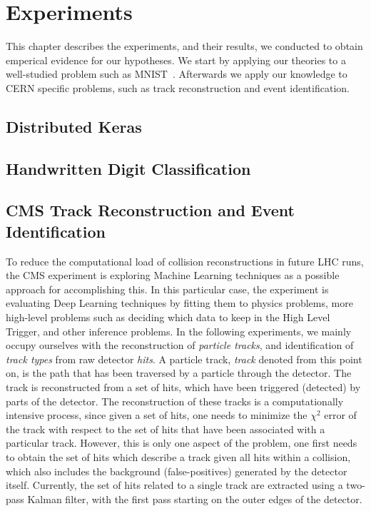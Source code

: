 %
%
%

\chapter{Experiments}
\label{chapter:experiments}

This chapter describes the experiments, and their results, we conducted to obtain emperical evidence for our hypotheses. We start by applying our theories to a well-studied problem such as MNIST~\cite{mnist}. Afterwards we apply our knowledge to CERN specific problems, such as track reconstruction and event identification.

\section{Distributed Keras}
\label{sec:distributed_keras}

\section{Handwritten Digit Classification}
\label{sec:experiment_mnist}

\section{CMS Track Reconstruction and Event Identification}
\label{sec:experiment_track_reconstruction}

To reduce the computational load of collision reconstructions in future LHC runs, the CMS experiment is exploring Machine Learning techniques as a possible approach for accomplishing this. In this particular case, the experiment is evaluating Deep Learning techniques by fitting them to physics problems, more high-level problems such as deciding which data to keep in the High Level Trigger, and other inference problems. In the following experiments, we mainly occupy ourselves with the reconstruction of \emph{particle tracks}, and identification of \emph{track types} from raw detector \emph{hits}. A particle track, \emph{track} denoted from this point on, is the path that has been traversed by a particle through the detector. The track is reconstructed from a set of hits, which have been triggered (detected) by parts of the detector. The reconstruction of these tracks is a computationally intensive process, since given a set of hits, one needs to minimize the $\chi^2$ error of the track with respect to the set of hits that have been associated with a particular track. However, this is only one aspect of the problem, one first needs to obtain the set of hits which describe a track given all hits within a collision, which also includes the background (false-positives) generated by the detector itself. Currently, the set of hits related to a single track are extracted using a two-pass Kalman filter, with the first pass starting on the outer edges of the detector.\\

